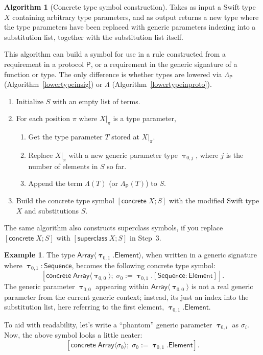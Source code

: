 \documentclass[headsepline,bibliography=totoc]{scrreport}
\newcommand{\namesym}[1]{\mathsf{#1}}
\newcommand{\proto}[1]{\bm{\mathsf{#1}}}
\newcommand{\genericsym}[2]{\bm{\uptau}_{#1,#2}}
\newcommand{\assocsym}[2]{[\proto{#1}\colon\namesym{#2}]}
\newcommand{\supersym}[1]{[\mathsf{superclass}\;#1]}
\newcommand{\concretesym}[1]{[\mathsf{concrete}\;#1]}
\theoremstyle{definition}
\newtheorem{example}{Example}[chapter]
\theoremstyle{definition}
\theoremstyle{definition}
\newtheorem{algorithm}{Algorithm}[chapter]
\begin{document}
\begin{algorithm}[Concrete type symbol construction]\label{concretesymbolcons}
Takes as input a Swift type $X$ containing arbitrary type parameters, and as output returns a new type where the type parameters have been replaced with generic parameters indexing into a substitution list, together with the substitution list itself.

This algorithm can build a symbol for use in a rule constructed from a requirement in a protocol $\proto{P}$, or a requirement in the generic signature of a function or type. The only difference is whether types are lowered via $\Lambda_{\proto{P}}$ (Algorithm~\ref{lowertypeinsig}) or $\Lambda$ (Algorithm~\ref{lowertypeinproto}).
\begin{enumerate}
\item Initialize $S$ with an empty list of terms.
\item For each position $\pi$ where $X|_{\pi}$ is a type parameter,
\begin{enumerate}
\item Get the type parameter $T$ stored at $X|_{\pi}$.
\item Replace $X|_{\pi}$ with a new generic parameter type $\genericsym{0}{j}$, where $j$ is the number of elements in $S$ so far.
\item Append the term $\Lambda(T)$ (or $\Lambda_{\proto{P}}(T)$) to $S$.
\end{enumerate}
\item Build the concrete type symbol $\concretesym{X;S}$ with the modified Swift type $X$ and substitutions $S$.
\end{enumerate}
\end{algorithm}
The same algorithm also constructs superclass symbols, if you replace $\concretesym{X;S}$ with $\supersym{X;S}$ in Step~3.

\begin{example}
The type $\namesym{Array}\langle\genericsym{0}{1}.\namesym{Element}\rangle$, when written in a generic signature where $\genericsym{0}{1}\colon\proto{Sequence}$, becomes the following concrete type symbol:
\[\concretesym{\namesym{Array}\langle\genericsym{0}{0}\rangle;\;\sigma_0:=\genericsym{0}{1}.\assocsym{Sequence}{Element}}.\]
The generic parameter $\genericsym{0}{0}$ appearing within $\namesym{Array}\langle\genericsym{0}{0}\rangle$ is not a real generic parameter from the current generic context; instead, its just an index into the substitution list, here referring to the first element, $\genericsym{0}{1}.\namesym{Element}$.

To aid with readability, let's write a ``phantom'' generic parameter $\genericsym{0}{i}$ as $\sigma_i$. Now, the above symbol looks a little neater:
\[\concretesym{\namesym{Array}\langle\sigma_0\rangle;\;\sigma_0:=\genericsym{0}{1}.\namesym{Element}}.\]
\end{example}
\end{document}
